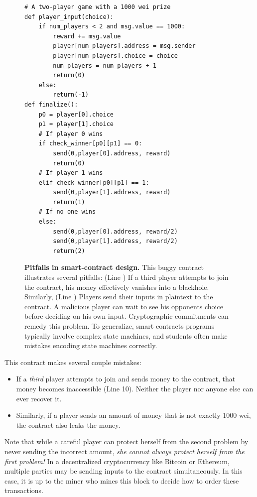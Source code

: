 \documentclass[10pt,twocolumn,letterpaper]{article}
\newcommand{\anote}[1]{{\color{magenta}{[AM: #1]}}}
\begin{document}
\begin{figure}
\begin{mdframed}
\begin{verbatim}
# A two-player game with a 1000 wei prize
def player_input(choice):
	if num_players < 2 and msg.value == 1000:
		reward += msg.value
		player[num_players].address = msg.sender
		player[num_players].choice = choice
		num_players = num_players + 1
		return(0)
	else:
		return(-1)
def finalize():
	p0 = player[0].choice
	p1 = player[1].choice
	# If player 0 wins
	if check_winner[p0][p1] == 0:
		send(0,player[0].address, reward)
		return(0)
	# If player 1 wins
	elif check_winner[p0][p1] == 1:
		send(0,player[1].address, reward)
		return(1)
	# If no one wins
	else:
		send(0,player[0].address, reward/2)
		send(0,player[1].address, reward/2)
		return(2)
\end{verbatim}
\end{mdframed}
\caption{
\label{fig:moneyleaks}
{\bf Pitfalls in smart-contract design.} This buggy contract illustrates several pitfalls:
(Line \anote{XXX}) If a third player
attempts to join the contract, his
money effectively vanishes into a blackhole. Similarly, 
(Line \anote{XXX}) Players send their inputs 
in plaintext to the contract. A malicious player 
can wait to see his opponents choice before deciding on his own input.
Cryptographic commitments can remedy this problem.
To generalize, smart contracts programs
typically involve complex state machines, and
students often make mistakes encoding 
state machines correctly. 
}
\end{figure}


This contract makes several couple mistakes:
\begin{itemize}[leftmargin=5mm]
\item
If a \emph{third} player attempts to join and sends money to the contract,
that money becomes inaccessible (Line 10). Neither the player nor anyone else can ever recover it.
\item
Similarly, if a player sends an amount of money that is not
exactly 1000 wei,
the contract also leaks the money.
\end{itemize}

Note that while a careful player 
can protect herself from the second problem by never sending the incorrect amount,
{\it she cannot always protect 
herself from the first problem!}
In a decentralized cryptocurrency
like Bitcoin or Ethereum, 
multiple parties may be sending inputs 
to the contract simultaneously.
In this case, it is up to the miner who mines this block
to decide how to order these transactions.
\end{document}
